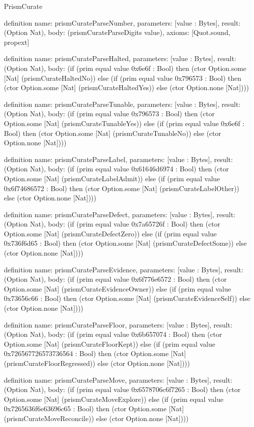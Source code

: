 \begin{lexlean}{PrismCurate}
\begin{semanticmodule}
definition{
  name: prismCurateParseNumber,
  parameters: [value : Bytes],
  result: (Option Nat),
  body: (prismCurateParseDigits value),
  axioms: [Quot.sound, propext]
}

definition{
  name: prismCurateParseHalted,
  parameters: [value : Bytes],
  result: (Option Nat),
  body: (if (prim equal value 0x6e6f : Bool) then (ctor Option.some [Nat] (prismCurateHaltedNo)) else (if (prim equal value 0x796573 : Bool) then (ctor Option.some [Nat] (prismCurateHaltedYes)) else (ctor Option.none [Nat])))
}

definition{
  name: prismCurateParseTunable,
  parameters: [value : Bytes],
  result: (Option Nat),
  body: (if (prim equal value 0x796573 : Bool) then (ctor Option.some [Nat] (prismCurateTunableYes)) else (if (prim equal value 0x6e6f : Bool) then (ctor Option.some [Nat] (prismCurateTunableNo)) else (ctor Option.none [Nat])))
}

definition{
  name: prismCurateParseLabel,
  parameters: [value : Bytes],
  result: (Option Nat),
  body: (if (prim equal value 0x61646d6974 : Bool) then (ctor Option.some [Nat] (prismCurateLabelAdmit)) else (if (prim equal value 0x6f74686572 : Bool) then (ctor Option.some [Nat] (prismCurateLabelOther)) else (ctor Option.none [Nat])))
}

definition{
  name: prismCurateParseDefect,
  parameters: [value : Bytes],
  result: (Option Nat),
  body: (if (prim equal value 0x7a65726f : Bool) then (ctor Option.some [Nat] (prismCurateDefectZero)) else (if (prim equal value 0x736f6d65 : Bool) then (ctor Option.some [Nat] (prismCurateDefectSome)) else (ctor Option.none [Nat])))
}

definition{
  name: prismCurateParseEvidence,
  parameters: [value : Bytes],
  result: (Option Nat),
  body: (if (prim equal value 0x6f776e6572 : Bool) then (ctor Option.some [Nat] (prismCurateEvidenceOwner)) else (if (prim equal value 0x73656c66 : Bool) then (ctor Option.some [Nat] (prismCurateEvidenceSelf)) else (ctor Option.none [Nat])))
}

definition{
  name: prismCurateParseFloor,
  parameters: [value : Bytes],
  result: (Option Nat),
  body: (if (prim equal value 0x6b657074 : Bool) then (ctor Option.some [Nat] (prismCurateFloorKept)) else (if (prim equal value 0x726567726573736564 : Bool) then (ctor Option.some [Nat] (prismCurateFloorRegressed)) else (ctor Option.none [Nat])))
}

definition{
  name: prismCurateParseMove,
  parameters: [value : Bytes],
  result: (Option Nat),
  body: (if (prim equal value 0x6578706c6f7265 : Bool) then (ctor Option.some [Nat] (prismCurateMoveExplore)) else (if (prim equal value 0x7265636f6e63696c65 : Bool) then (ctor Option.some [Nat] (prismCurateMoveReconcile)) else (ctor Option.none [Nat])))
}


\end{semanticmodule}
\end{lexlean}
